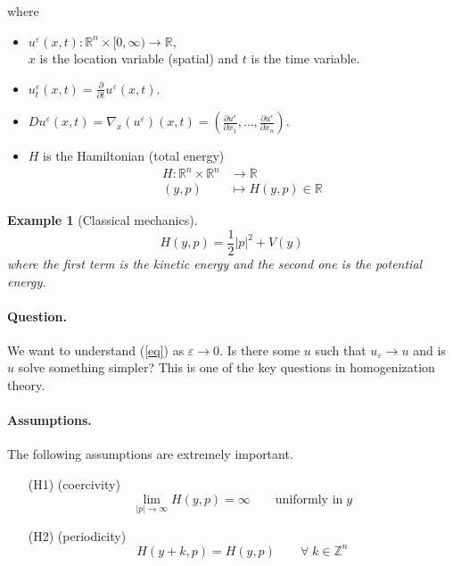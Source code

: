 \documentclass[12pt, oneside]{amsart}  	%
\newtheorem{example}{Example}
\begin{document}
where

\begin{itemize}
\item $u^\varepsilon(x,t): \mathbb{R}^n\times[0,\infty)\longrightarrow\mathbb{R}$,\\ $x$ is the location variable (spatial) and $t$ is the time variable.
\item $u_t^\varepsilon(x,t) = \frac{\partial}{\partial t}u^\varepsilon(x,t)$.
\item $Du^\varepsilon(x,t) = \nabla_x(u^\varepsilon)(x,t) = \left(\frac{\partial u^\varepsilon}{\partial x_1},\ldots, \frac{\partial u^\varepsilon}{\partial x_n}\right)$.
\item $H$ is the Hamiltonian (total energy)
\begin{align*}
H: \mathbb{R}^n\times \mathbb{R}^n &\longrightarrow \mathbb{R}\\
(y,p)&\longmapsto H(y,p) \in \mathbb{R}
\end{align*}
\end{itemize}


\begin{example}[Classical mechanics]
\begin{equation*}
H(y,p) = \frac{1}{2}|p|^2 + V(y)
\end{equation*}
where the first term is the kinetic energy and the second one is the potential energy.
\end{example}

\paragraph{\textbf{Question.}}
We want to understand (\ref{eq}) as $\varepsilon\longrightarrow 0$. Is there some $u$ such that $u_\varepsilon\longrightarrow u$ and is $u$ solve something simpler? This is one of the key questions in homogenization theory.\\



\paragraph{\textbf{Assumptions.}} The following assumptions are extremely important.
\begin{itemize}
\item[(H1)] (coercivity) 
\begin{equation*}
\lim_{|p|\longrightarrow\infty} H(y,p) = \infty \qquad\text{uniformly in}\;y
\end{equation*}
\item[(H2)] (periodicity) 
\begin{equation*}
H(y+k,p) = H(y,p) \qquad\forall\;k\in \mathbb{Z}^n
\end{equation*}
\end{itemize}
\end{document}
